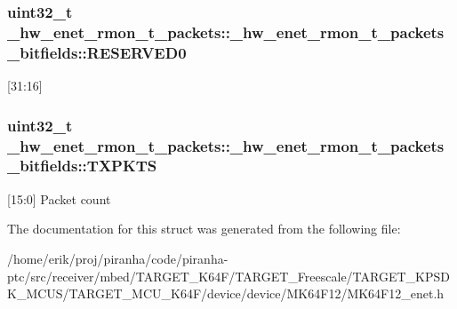 \subsubsection[{\texorpdfstring{R\+E\+S\+E\+R\+V\+E\+D0}{RESERVED0}}]{\setlength{\rightskip}{0pt plus 5cm}uint32\+\_\+t \+\_\+hw\+\_\+enet\+\_\+rmon\+\_\+t\+\_\+packets\+::\+\_\+hw\+\_\+enet\+\_\+rmon\+\_\+t\+\_\+packets\+\_\+bitfields\+::\+R\+E\+S\+E\+R\+V\+E\+D0}\hypertarget{struct__hw__enet__rmon__t__packets_1_1__hw__enet__rmon__t__packets__bitfields_aa16f1744b51e79d97c6c10a4ecb4d00e}{}\label{struct__hw__enet__rmon__t__packets_1_1__hw__enet__rmon__t__packets__bitfields_aa16f1744b51e79d97c6c10a4ecb4d00e}
\mbox{[}31\+:16\mbox{]} 
\subsubsection[{\texorpdfstring{T\+X\+P\+K\+TS}{TXPKTS}}]{\setlength{\rightskip}{0pt plus 5cm}uint32\+\_\+t \+\_\+hw\+\_\+enet\+\_\+rmon\+\_\+t\+\_\+packets\+::\+\_\+hw\+\_\+enet\+\_\+rmon\+\_\+t\+\_\+packets\+\_\+bitfields\+::\+T\+X\+P\+K\+TS}\hypertarget{struct__hw__enet__rmon__t__packets_1_1__hw__enet__rmon__t__packets__bitfields_a1e69dc732f31649e12bdf59f76869c04}{}\label{struct__hw__enet__rmon__t__packets_1_1__hw__enet__rmon__t__packets__bitfields_a1e69dc732f31649e12bdf59f76869c04}
\mbox{[}15\+:0\mbox{]} Packet count 

The documentation for this struct was generated from the following file\+:\begin{DoxyCompactItemize}
\item 
/home/erik/proj/piranha/code/piranha-\/ptc/src/receiver/mbed/\+T\+A\+R\+G\+E\+T\+\_\+\+K64\+F/\+T\+A\+R\+G\+E\+T\+\_\+\+Freescale/\+T\+A\+R\+G\+E\+T\+\_\+\+K\+P\+S\+D\+K\+\_\+\+M\+C\+U\+S/\+T\+A\+R\+G\+E\+T\+\_\+\+M\+C\+U\+\_\+\+K64\+F/device/device/\+M\+K64\+F12/M\+K64\+F12\+\_\+enet.\+h\end{DoxyCompactItemize}
